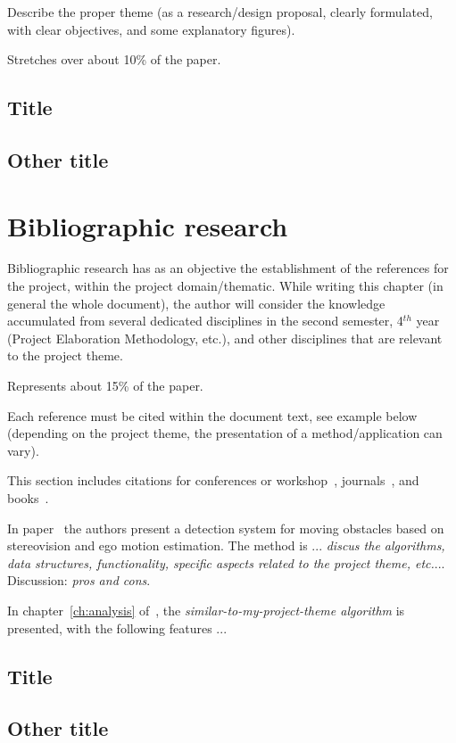 \documentclass[12pt,a4paper,twoside]{report}
\begin{document}
Describe the proper theme (as a research/design proposal, clearly formulated, with clear objectives, and some explanatory figures).

Stretches over about 10\% of the paper.

\section{Title}
\section{Other title}

\chapter{Bibliographic research}


Bibliographic research has as an objective the establishment of the references for the project, within the project domain/thematic. While writing this chapter (in general the whole document), the author will consider the knowledge accumulated from several dedicated disciplines in the second semester, 4$^{th}$ year (Project Elaboration Methodology, etc.), and other disciplines that are relevant to the project theme.

Represents about 15\% of the paper.

Each reference must be cited within the document text, see example below (depending on the project theme, the presentation of a method/application can vary).


This section includes citations for conferences or workshop~\cite{BellucciLZ04}, journals~\cite{AntoniouSBDB07}, 
and books~\cite{russell1995artificial}. 

In paper~\cite{AntoniouSBDB07} the authors present a detection system for moving obstacles based on stereovision and ego motion estimation. 
The method is ... {\it discus the algorithms, data structures, functionality, specific aspects related to the project theme, etc.}... Discussion: {\it pros and cons}.

In chapter~\ref{ch:analysis} of~\cite{strunk}, the {\it similar-to-my-project-theme algorithm} is presented, with the following features ...


\section{Title}
\section{Other title}
\end{document}
